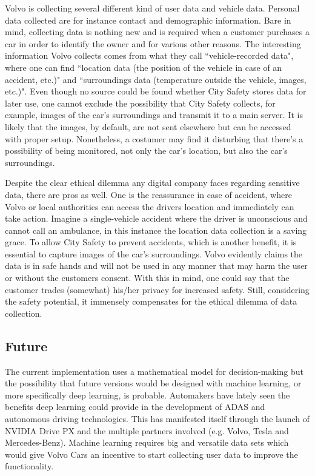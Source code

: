 \documentclass[conference]{IEEEtran}
\begin{document}
Volvo is collecting several different kind of user data and vehicle data. Personal data collected are for instance contact and demographic information. \cite{PrivacyPolicy} Bare in mind, collecting data is nothing new and is required when a customer purchases a car in order to identify the owner and for various other reasons. The interesting information Volvo collects comes from what they call ``vehicle-recorded data", where one can find ``location data (the position of the vehicle in case of an accident, etc.)" and ``surroundings data (temperature outside the vehicle, images, etc.)". \cite{PrivacyPolicy} Even though no source could be found whether City Safety stores data for later use, one cannot exclude the possibility that City Safety collects, for example, images of the car's surroundings and transmit it to a main server. It is likely that the images, by default, are not sent elsewhere but can be accessed with proper setup. Nonetheless, a costumer may find it disturbing that there's a possibility of being monitored, not only the car's location, but also the car's surroundings.

Despite the clear ethical dilemma any digital company faces regarding sensitive data, there are pros as well. One is the reassurance in case of accident, where Volvo or local authorities can access the drivers location and immediately can take action. Imagine a single-vehicle accident where the driver is unconscious and cannot call an ambulance, in this instance the location data collection is a saving grace. To allow City Safety to prevent accidents, which is another benefit, it is essential to capture images of the car's surroundings. Volvo evidently claims the data is in safe hands and will not be used in any manner that may harm the user or without the customers consent. \cite{PrivacyPolicy} With this in mind, one could say that the customer trades (somewhat) his/her privacy for increased safety. Still, considering the safety potential, it immensely compensates for the ethical dilemma of data collection.

\subsection{Future}
The current implementation uses a mathematical model for decision-making but the possibility that future versions would be designed with machine learning, or more specifically deep learning, is probable. \cite{SysDescription} Automakers have lately seen the benefits deep learning could provide in the development of ADAS and autonomous driving technologies. This has manifested itself through the launch of NVIDIA Drive PX and the multiple partners involved (e.g. Volvo, Tesla and Mercedes-Benz). \cite{DrivePX} Machine learning requires big and versatile data sets which would give Volvo Cars an incentive to start collecting user data to improve the functionality.
\end{document}
